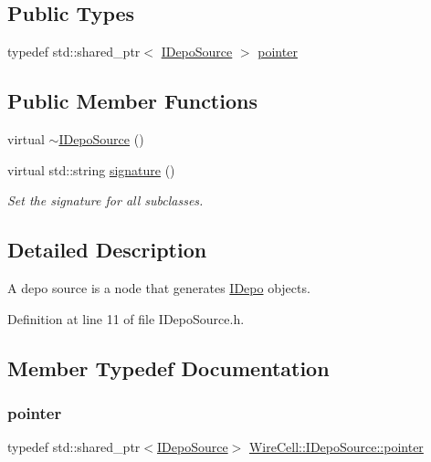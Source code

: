 \subsection*{Public Types}
\begin{DoxyCompactItemize}
\item 
typedef std\+::shared\+\_\+ptr$<$ \hyperlink{class_wire_cell_1_1_i_depo_source}{I\+Depo\+Source} $>$ \hyperlink{class_wire_cell_1_1_i_depo_source_a332e8b3d39f21a260c43c7a09c08eabd}{pointer}
\end{DoxyCompactItemize}
\subsection*{Public Member Functions}
\begin{DoxyCompactItemize}
\item 
virtual \hyperlink{class_wire_cell_1_1_i_depo_source_a842399da5e2203eba2056a722e66bb52}{$\sim$\+I\+Depo\+Source} ()
\item 
virtual std\+::string \hyperlink{class_wire_cell_1_1_i_depo_source_a2d49f81dff56ffe7fefed50219395c3b}{signature} ()
\begin{DoxyCompactList}\small\item\em Set the signature for all subclasses. \end{DoxyCompactList}\end{DoxyCompactItemize}


\subsection{Detailed Description}
A depo source is a node that generates \hyperlink{class_wire_cell_1_1_i_depo}{I\+Depo} objects. 

Definition at line 11 of file I\+Depo\+Source.\+h.



\subsection{Member Typedef Documentation}
\mbox{\label{class_wire_cell_1_1_i_depo_source_a332e8b3d39f21a260c43c7a09c08eabd}} 
\subsubsection{\texorpdfstring{pointer}{pointer}}
{\footnotesize\ttfamily typedef std\+::shared\+\_\+ptr$<$\hyperlink{class_wire_cell_1_1_i_depo_source}{I\+Depo\+Source}$>$ \hyperlink{class_wire_cell_1_1_i_depo_source_a332e8b3d39f21a260c43c7a09c08eabd}{Wire\+Cell\+::\+I\+Depo\+Source\+::pointer}}




